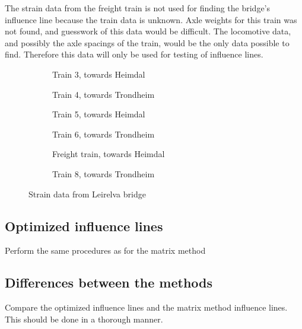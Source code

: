 The strain data from the freight train is not used for finding the bridge's influence line because the train data is unknown. Axle weights for this train was not found, and guesswork of this data would be difficult. The locomotive data, and possibly the axle spacings of the train, would be the only data possible to find. Therefore this data will only be used for testing of influence lines.
\begin{figure}[H]
	\centering
	\begin{subfigure}[t]{0.4\textwidth}
		\centering
		
		\caption{Train 3, towards Heimdal}
		\label{fig:strain_train3}
	\end{subfigure}
	\qquad
	\begin{subfigure}[t]{0.4\textwidth}
		\centering
		
		\caption{Train 4, towards Trondheim}
		\label{fig:strain_train4}
	\end{subfigure}

	\begin{subfigure}[t]{0.4\textwidth}
		\centering
		
		\caption{Train 5, towards Heimdal}
		\label{fig:strain_train5}
	\end{subfigure}
	\qquad
  \begin{subfigure}[t]{0.4\textwidth}
    \centering
    
		\caption{Train 6, towards Trondheim}
    \label{fig:strain_train6}
  \end{subfigure}

  \begin{subfigure}[t]{0.4\textwidth}
    \centering
    
		\caption{Freight train, towards Heimdal}
    \label{fig:strain_train7}
  \end{subfigure}
    \qquad
	\begin{subfigure}[t]{0.4\textwidth}
		\centering
		
		\caption{Train 8, towards Trondheim}
		\label{fig:strain_train8}
	\end{subfigure}
  \caption{Strain data from Leirelva bridge}
  \label{fig:strain_all}
\end{figure}

\subsection{Optimized influence lines}
Perform the same procedures as for the matrix method

\subsection{Differences between the methods}
Compare the optimized influence lines and the matrix method influence lines. This should be done in a thorough manner.
